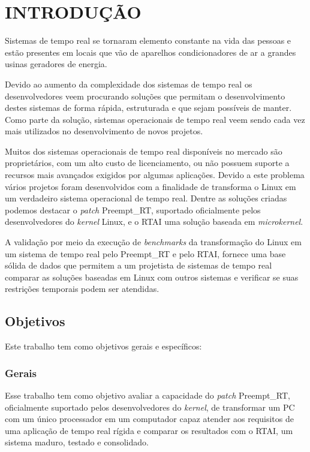\chapter{INTRODUÇÃO}
\label{cap:introducao}
Sistemas de tempo real se tornaram elemento constante na vida das pessoas e estão presentes em locais que vão de aparelhos condicionadores de ar a grandes usinas geradores de energia.

Devido ao aumento da complexidade dos sistemas de tempo real os desenvolvedores veem procurando soluções que permitam o desenvolvimento destes sistemas de forma rápida, estruturada e que sejam possíveis de manter. Como parte da solução, sistemas operacionais de tempo real veem sendo cada vez mais utilizados no desenvolvimento de novos projetos. 

Muitos dos sistemas operacionais de tempo real disponíveis no mercado são proprietários, com um alto custo de licenciamento, ou não possuem suporte a recursos mais avançados exigidos por algumas aplicações. Devido a este problema vários projetos foram desenvolvidos com a finalidade de transforma o Linux em um verdadeiro sistema operacional de tempo real. Dentre as soluções criadas podemos destacar o \textit{patch} Preempt\_RT, suportado oficialmente pelos desenvolvedores do \textit{kernel} Linux, e o RTAI uma solução baseada em \textit{microkernel}.

A validação por meio da execução de \textit{benchmarks} da transformação do Linux em um sistema de tempo real pelo Preempt\_RT e pelo RTAI, fornece uma base sólida de dados que permitem a um projetista de sistemas de tempo real comparar as soluções baseadas em Linux com outros sistemas e verificar se suas restrições temporais podem ser atendidas.

\section{Objetivos}
Este trabalho tem como objetivos gerais e específicos:
\subsection{Gerais}
Esse trabalho tem como objetivo avaliar a capacidade do \textit{patch} Preempt\_RT, oficialmente
suportado pelos desenvolvedores do \textit{kernel}, de transformar um PC com um único processador em um
computador capaz atender aos requisitos de uma aplicação de tempo real rígida e comparar os
resultados com o RTAI, um sistema maduro, testado e consolidado.

